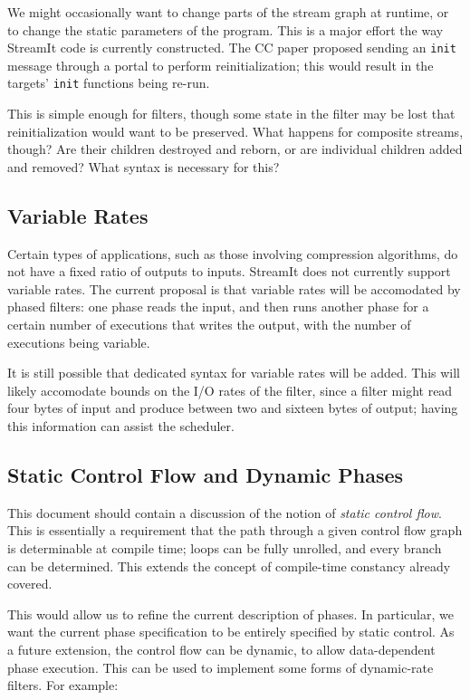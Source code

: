 \documentclass[11pt]{article}
\begin{document}
We might occasionally want to change parts of the stream graph at
runtime, or to change the static parameters of the program.  This is a
major effort the way StreamIt code is currently constructed.  The CC
paper proposed sending an \lstinline|init| message through a portal to
perform reinitialization; this would result in the targets'
\lstinline|init| functions being re-run.

This is simple enough for filters, though some state in the filter may
be lost that reinitialization would want to be preserved.  What
happens for composite streams, though?  Are their children destroyed
and reborn, or are individual children added and removed?  What syntax
is necessary for this?

\subsection{Variable Rates}

Certain types of applications, such as those involving compression
algorithms, do not have a fixed ratio of outputs to inputs.  StreamIt
does not currently support variable rates.  The current proposal is
that variable rates will be accomodated by phased filters: one phase
reads the input, and then runs another phase for a certain number of
executions that writes the output, with the number of executions being
variable.

It is still possible that dedicated syntax for variable rates will be
added.  This will likely accomodate bounds on the I/O rates of the
filter, since a filter might read four bytes of input and produce
between two and sixteen bytes of output; having this information can
assist the scheduler.

\subsection{Static Control Flow and Dynamic Phases}

This document should contain a discussion of the notion of
\emph{static control flow}.  This is essentially a requirement that
the path through a given control flow graph is determinable at compile
time; loops can be fully unrolled, and every branch can be
determined.  This extends the concept of compile-time constancy
already covered.

This would allow us to refine the current description of phases.  In
particular, we want the current phase specification to be entirely
specified by static control.  As a future extension, the control flow
can be dynamic, to allow data-dependent phase execution.  This can be
used to implement some forms of dynamic-rate filters.  For example:
\end{document}
